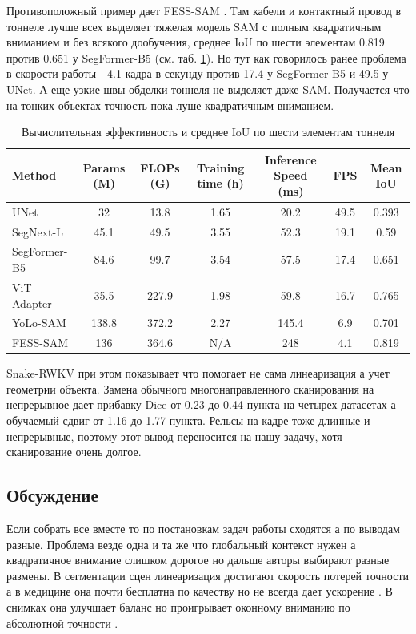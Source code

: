 \documentclass[areasetadvanced]{scrartcl}
\begin{document}
		Противоположный пример дает FESS-SAM \cite{fesssam}. Там кабели и контактный провод в тоннеле лучше всех выделяет тяжелая модель SAM с полным
		квадратичным вниманием и без всякого дообучения, среднее IoU по шести элементам 0.819 против 0.651 у SegFormer-B5 (см. таб. \ref{tab:fesssam11}).
		Но тут как говорилось ранее проблема в скорости работы - 4.1 кадра в секунду против 17.4 у SegFormer-B5 и 49.5 у UNet. 
		А еще узкие швы обделки тоннеля не выделяет даже SAM.
		Получается что на тонких объектах точность пока луше квадратичным вниманием.

		\begin{table}[H]
			\centering
			\footnotesize
			\caption{Вычислительная эффективность и среднее IoU по шести элементам тоннеля \cite{fesssam}}
			\label{tab:fesssam11}
			\begin{tabular}{lcccccc}
				\toprule
				Method & Params (M) & FLOPs (G) & Training time (h) & Inference Speed (ms) & FPS & Mean IoU \\
				\midrule
				UNet & 32 & 13.8 & 1.65 & 20.2 & 49.5 & 0.393 \\
				SegNext-L & 45.1 & 49.5 & 3.55 & 52.3 & 19.1 & 0.59 \\
				SegFormer-B5 & 84.6 & 99.7 & 3.54 & 57.5 & 17.4 & 0.651 \\
				ViT-Adapter & 35.5 & 227.9 & 1.98 & 59.8 & 16.7 & 0.765 \\
				YoLo-SAM & 138.8 & 372.2 & 2.27 & 145.4 & 6.9 & 0.701 \\
				FESS-SAM & 136 & 364.6 & N/A & 248 & 4.1 & 0.819 \\
				\bottomrule
			\end{tabular}
		\end{table}

		Snake-RWKV \cite{snakerwkv} при этом показывает что помогает не сама линеаризация а учет геометрии объекта. Замена обычного многонаправленного
		сканирования на непрерывное дает прибавку Dice от 0.23 до 0.44 пункта на четырех датасетах а обучаемый сдвиг от 1.16 до
		1.77 пункта. Рельсы на кадре тоже длинные и непрерывные, поэтому этот вывод переносится на нашу задачу, хотя сканирование очень долгое.

	\subsection{Обсуждение}
		Если собрать все вместе то по постановкам задач работы сходятся а по выводам разные. Проблема везде одна и та же что глобальный контекст нужен
		а квадратичное внимание слишком дорогое но дальше авторы выбирают разные размены. В сегментации сцен линеаризация достигают скорость потерей
		точности \cite{lsnet, rtlinearformer} а в медицине она почти бесплатна по качеству но не всегда дает ускорение \cite{mlformer, cltmambaseg,
		snakerwkv}. В снимках она улучшает баланс но проигрывает оконному вниманию по абсолютной точности \cite{abcfnet}.
\end{document}
